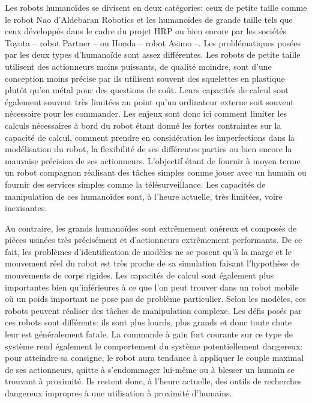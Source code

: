 Les robots humanoïdes se divisent en deux catégories: ceux de petite
taille comme le robot Nao d'Aldebaran Robotics et les humanoïdes de
grande taille tels que ceux développés dans le cadre du projet HRP ou
bien encore par les sociétés Toyota -- robot Partner -- ou Honda --
robot Asimo --. Les problématiques posées par les deux types
d'humanoïde sont assez différentes. Les robots de petite taille
utilisent des actionneurs moins puissants, de qualité moindre, sont
d'une conception moins précise par ils utilisent souvent des
squelettes en plastique plutôt qu'en métal pour des questions de
coût. Leurs capacités de calcul sont également souvent très limitées
au point qu'un ordinateur externe soit souvent nécessaire pour les
commander. Les enjeux sont donc ici comment limiter les calculs
nécessaires à bord du robot étant donné les fortes contraintes sur la
capacité de calcul, comment prendre en considération les imperfections
dans la modélisation du robot, la flexibilité de ses différentes
parties ou bien encore la mauvaise précision de ses
actionneurs. L'objectif étant de fournir à moyen terme un robot
compagnon réalisant des tâches simples comme jouer avec un humain ou
fournir des services simples comme la télésurveillance. Les capacités
de manipulation de ces humanoïdes sont, à l'heure actuelle, très
limitées, voire inexisantes.


Au contraire, les grands humanoïdes sont extrêmement onéreux et
composés de pièces usinées très précisément et d'actionneurs
extrêmement performants. De ce fait, les problèmes d'identification de
modèles ne se posent qu'à la marge et le mouvement réel du robot est
très proche de sa simulation faisant l'hypothèse de mouvements de
corps rigides. Les capacités de calcul sont également plus importantes
bien qu'inférieures à ce que l'on peut trouver dans un robot mobile où
un poids important ne pose pas de problème particulier. Selon les
modèles, ces robots peuvent réaliser des tâches de manipulation
complexe. Les défis posés par ces robots sont différents: ils sont
plus lourds, plus grands et donc toute chute leur est généralement
fatale. La commande à gain fort courante sur ce type de système rend
également le comportement du système potentiellement dangereux: pour
atteindre sa consigne, le robot aura tendance à appliquer le couple
maximal de ses actionneurs, quitte à s'endommager lui-même ou à
blesser un humain se trouvant à proximité. Ils restent donc, à l'heure
actuelle, des outils de recherches dangereux impropres à une
utilisation à proximité d'humains.


